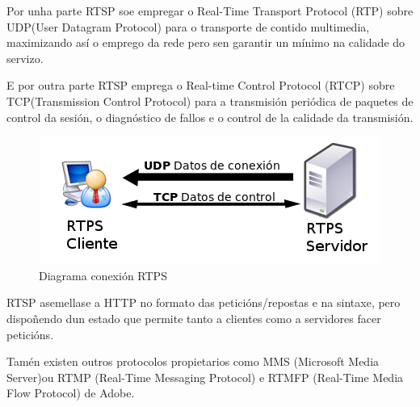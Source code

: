             Por unha parte RTSP soe empregar o Real-Time Transport Protocol (RTP) sobre UDP(User 
            Datagram Protocol) para o transporte de contido multimedia, maximizando así o emprego 
            da rede pero sen garantir un mínimo na calidade do servizo.
            
            E por outra parte RTSP emprega o Real-time Control Protocol (RTCP) sobre TCP(Transmission 
            Control Protocol) para a transmisión periódica de paquetes de control da sesión, o
            diagnóstico de fallos e o control de la calidade da transmisión.
            
            \begin{figure}[htp]
            \begin{center}
                \includegraphics[scale=0.6]{figures/RTPS-diagram.png}
                \caption{Diagrama conexión RTPS}
            \label{fig:RTPS-diagram}
            \end{center}
            \end{figure}
            
            RTSP asemellase a HTTP no formato das peticións/repostas e na sintaxe, pero dispoñendo 
            dun estado que permite tanto a clientes como a servidores facer peticións.

            Tamén existen outros protocolos propietarios como MMS (Microsoft Media Server)ou RTMP 
            (Real-Time Messaging Protocol) e RTMFP (Real-Time Media Flow Protocol) de Adobe.
            